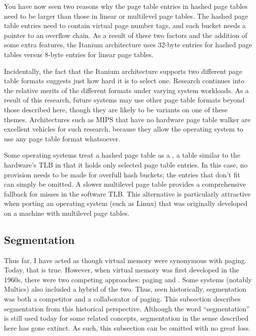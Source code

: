 You have now seen two reasons why the page table entries in hashed
page tables need to be larger than those in linear or multilevel page
tables.  The hashed page table entries need to contain virtual page
number tags, and each bucket needs a pointer to an
overflow chain. As a
result of these two factors and the addition of some extra features,
the Itanium architecture uses 32-byte entries for hashed page tables
versus 8-byte entries for linear page tables.

Incidentally, the fact that the Itanium architecture supports two
different page table formats suggests just how hard it is to select
one.  Research continues into the relative merits of the different
formats under varying system workloads.  As a result of this research,
future systems may use other page table formats beyond those described
here, though they are likely to be variants on one of these themes.
Architectures such as MIPS that have no hardware page table walker are
excellent vehicles for such research, because they allow the operating
system to use any page table format whatsoever.

Some operating systems treat a hashed page table as a
, a table similar to the hardware's TLB in
that it holds only selected page table entries.  In this case, no
provision needs to be made for overfull hash buckets; the entries
that don't fit can simply be omitted.  A slower multilevel page table
provides a comprehensive fallback for misses in the software TLB.
This alternative is particularly
attractive when porting an operating system (such as Linux) that was
originally developed on a machine with multilevel page tables.

\subsection{Segmentation}\label{vm-segmentation-section}

Thus far, I have acted as though virtual memory were synonymous with
paging.  Today, that is true.  However, when virtual memory was first
developed in the 1960s, there were two competing approaches: paging
and .  Some systems (notably Multics) also included a
hybrid of the two.  Thus, seen historically, segmentation was both a
competitor and a collaborator of paging.
This subsection describes segmentation from this historical perspective. Although the word ``segmentation'' is still used today for some related concepts,
segmentation in the sense described here has gone extinct.
As
such, this subsection can be omitted with no great loss.

